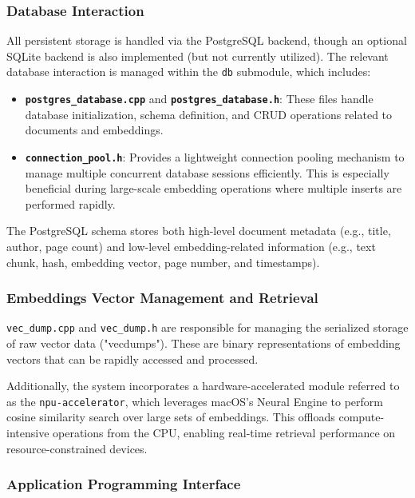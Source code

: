 \subsubsection{Database Interaction}

All persistent storage is handled via the PostgreSQL backend, though an optional SQLite backend is also implemented (but not currently utilized). The relevant database interaction is managed within the \texttt{db} submodule, which includes:

\begin{itemize}
    \item \textbf{\texttt{postgres\_database.cpp}} and \textbf{\texttt{postgres\_database.h}}: These files handle database initialization, schema definition, and CRUD operations related to documents and embeddings.
    \item \textbf{\texttt{connection\_pool.h}}: Provides a lightweight connection pooling mechanism to manage multiple concurrent database sessions efficiently. This is especially beneficial during large-scale embedding operations where multiple inserts are performed rapidly.
\end{itemize}

The PostgreSQL schema stores both high-level document metadata (e.g., title, author, page count) and low-level embedding-related information (e.g., text chunk, hash, embedding vector, page number, and timestamps).

\subsubsection{Embeddings Vector Management and Retrieval}

\texttt{vec\_dump.cpp} and \texttt{vec\_dump.h} are responsible for managing the serialized storage of raw vector data ("vecdumps"). These are binary representations of embedding vectors that can be rapidly accessed and processed.

Additionally, the system incorporates a hardware-accelerated module referred to as the \texttt{npu-accelerator}, which leverages macOS’s Neural Engine to perform cosine similarity search over large sets of embeddings. This offloads compute-intensive operations from the CPU, enabling real-time retrieval performance on resource-constrained devices.

\subsubsection{Application Programming Interface}

